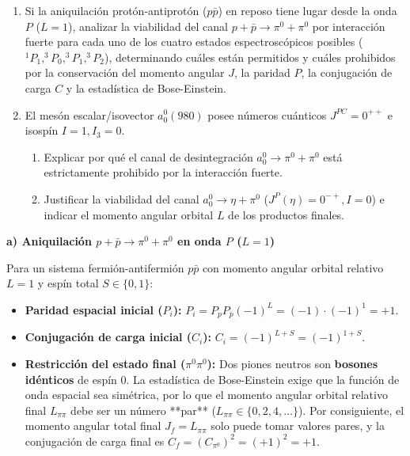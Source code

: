 \newpage
\begin{problema}
\begin{enumerate}[label=\alph*)]
    \item Si la aniquilación protón-antiprotón ($p\bar{p}$) en reposo tiene lugar desde la onda $P$ ($L=1$), analizar la viabilidad del canal $p + \bar{p} \to \pi^0 + \pi^0$ por interacción fuerte para cada uno de los cuatro estados espectroscópicos posibles ($^1P_1, ^3P_0, ^3P_1, ^3P_2$), determinando cuáles están permitidos y cuáles prohibidos por la conservación del momento angular $J$, la paridad $P$, la conjugación de carga $C$ y la estadística de Bose-Einstein.
    \item El mesón escalar/isovector $a_0^0(980)$ posee números cuánticos $J^{PC} = 0^{++}$ e isospín $I=1, I_3=0$.
    \begin{enumerate}[label=\arabic*.]
        \item Explicar por qué el canal de desintegración $a_0^0 \to \pi^0 + \pi^0$ está estrictamente prohibido por la interacción fuerte.
        \item Justificar la viabilidad del canal $a_0^0 \to \eta + \pi^0$ ($J^P(\eta)=0^{-+}, I=0$) e indicar el momento angular orbital $L$ de los productos finales.
    \end{enumerate}
\end{enumerate}

\tcblower

\textbf{a) Aniquilación $p + \bar{p} \to \pi^0 + \pi^0$ en onda $P$ ($L=1$)}

Para un sistema fermión-antifermión $p\bar{p}$ con momento angular orbital relativo $L=1$ y espín total $S \in \{0, 1\}$:
\begin{itemize}
    \item \textbf{Paridad espacial inicial ($P_i$):} $P_i = P_p P_{\bar{p}} (-1)^L = (-1) \cdot (-1)^1 = +1$.
    \item \textbf{Conjugación de carga inicial ($C_i$):} $C_i = (-1)^{L+S} = (-1)^{1+S}$.
    \item \textbf{Restricción del estado final ($\pi^0\pi^0$):} Dos piones neutros son \textbf{bosones idénticos} de espín 0. La estadística de Bose-Einstein exige que la función de onda espacial sea simétrica, por lo que el momento angular orbital relativo final $L_{\pi\pi}$ debe ser un número **par** ($L_{\pi\pi} \in \{0, 2, 4, \dots\}$). Por consiguiente, el momento angular total final $J_f = L_{\pi\pi}$ solo puede tomar valores pares, y la conjugación de carga final es $C_f = (C_{\pi^0})^2 = (+1)^2 = +1$.
\end{itemize}


\end{problema}
